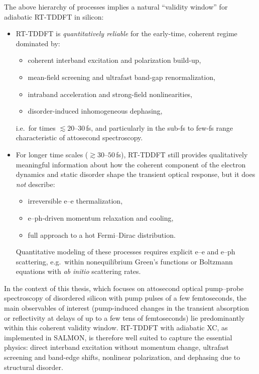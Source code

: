 The above hierarchy of processes implies a natural ``validity window'' for adiabatic RT-TDDFT in silicon:

\begin{itemize}
  \item RT-TDDFT is \emph{quantitatively reliable} for the early-time, coherent regime dominated by:
  \begin{itemize}
    \item coherent interband excitation and polarization build-up,
    \item mean-field screening and ultrafast band-gap renormalization,
    \item intraband acceleration and strong-field nonlinearities,
    \item disorder-induced inhomogeneous dephasing,
  \end{itemize}
  i.e.\ for times $\lesssim 20$--$30$\,fs, and particularly in the sub-fs to few-fs range characteristic of attosecond spectroscopy.\cite{Schultze2014,Yabana2012,Sato2025review}
  
  \item For longer time scales ($\gtrsim 30$--$50$\,fs), RT-TDDFT still provides qualitatively meaningful information about how the coherent component of the electron dynamics and static disorder shape the transient optical response, but it does \emph{not} describe:
  \begin{itemize}
    \item irreversible e--e thermalization,
    \item e--ph-driven momentum relaxation and cooling,
    \item full approach to a hot Fermi--Dirac distribution.
  \end{itemize}
  Quantitative modeling of these processes requires explicit e--e and e--ph scattering, e.g.\ within nonequilibrium Green's functions or Boltzmann equations with \textit{ab initio} scattering rates.\cite{Sjakste2025,Bernardi2014}
\end{itemize}

In the context of this thesis, which focuses on attosecond optical pump--probe spectroscopy of disordered silicon with pump pulses of a few femtoseconds, the main observables of interest (pump-induced changes in the transient absorption or reflectivity at delays of up to a few tens of femtoseconds) lie predominantly within this coherent validity window.
RT-TDDFT with adiabatic XC, as implemented in SALMON, is therefore well suited to capture the essential physics: direct interband excitation without momentum change, ultrafast screening and band-edge shifts, nonlinear polarization, and dephasing due to structural disorder.
